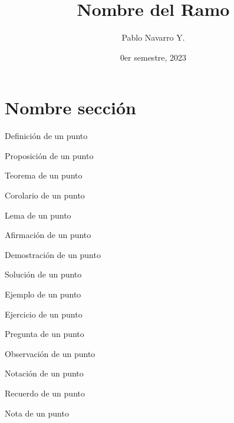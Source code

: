 \documentclass{apuntes}
\title{Nombre del Ramo}
\author{Pablo Navarro Y.}
\date{0er semestre, 2023}
\begin{document}
\renewcommand{\onlyinsubfile}[1]{}
\renewcommand{\notinsubfile}[1]{#1}

\maketitle

\section{Nombre sección}
\begin{definicion}[][reff]
  Definición de un punto
  \lipsum[1]
\end{definicion}

\begin{prop}[][reff]
  Proposición de un punto
  \lipsum[1]
\end{prop}

\begin{teorema}[][reff]
  Teorema de un punto
  \lipsum[1]
\end{teorema}

\begin{corolario}[][reff]
  Corolario de un punto
  \lipsum[1]
\end{corolario}

\begin{lema}[][reff]
  Lema de un punto
  \lipsum[1]
\end{lema}

\begin{aff}[]
  Afirmación de un punto
  \lipsum[1]
\end{aff}

\begin{dem}[]
  Demostración de un punto
  \lipsum[1]
\end{dem}

\begin{sol}[]
  Solución de un punto
  \lipsum[1]
\end{sol}

\begin{ejemplo}[][reff]
  Ejemplo de un punto
  \lipsum[1]
\end{ejemplo}

\begin{ejercicio}[][reff]
  Ejercicio de un punto
  \lipsum[1]
\end{ejercicio}

\begin{pregunta}[][reff]
  Pregunta de un punto
  \lipsum[1]
\end{pregunta}

\begin{obs}[][reff]
  Observación de un punto
  \lipsum[1]
\end{obs}

\begin{notacion}[]
  Notación de un punto
  \lipsum[1]
\end{notacion}

\begin{recuerdo}[]
  Recuerdo de un punto
  \lipsum[1]
\end{recuerdo}

\begin{nota}[]
  Nota de un punto
  \lipsum[1]
\end{nota}
\end{document}
